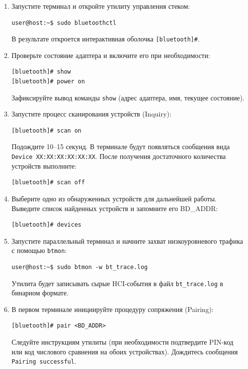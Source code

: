 \begin{enumerate}[nosep, leftmargin=*]
    \item Запустите терминал и откройте утилиту управления стеком:
    \begin{lstlisting}
user@host:~$ sudo bluetoothctl
    \end{lstlisting}
    В результате откроется интерактивная оболочка \texttt{[bluetooth]\#}.

    \item Проверьте состояние адаптера и включите его при необходимости:
    \begin{lstlisting}
[bluetooth]# show
[bluetooth]# power on
    \end{lstlisting}
    Зафиксируйте вывод команды \texttt{show} (адрес адаптера, имя, текущее состояние).

    \item Запустите процесс сканирования устройств (Inquiry):
    \begin{lstlisting}
[bluetooth]# scan on
    \end{lstlisting}
    Подождите 10--15 секунд. В терминале будут появляться сообщения вида \lstinline|Device XX:XX:XX:XX:XX:XX|. После получения достаточного количества устройств выполните:
    \begin{lstlisting}
[bluetooth]# scan off
    \end{lstlisting}

    \item Выберите одно из обнаруженных устройств для дальнейшей работы. Выведите список найденных устройств и запомните его BD\_ADDR:
    \begin{lstlisting}
[bluetooth]# devices
    \end{lstlisting}

    \item Запустите параллельный терминал и начните захват низкоуровневого трафика с помощью \texttt{btmon}:
    \begin{lstlisting}
user@host:~$ sudo btmon -w bt_trace.log
    \end{lstlisting}
    Утилита будет записывать сырые HCI-события в файл \texttt{bt\_trace.log} в бинарном формате.

    \item В первом терминале инициируйте процедуру сопряжения (Pairing):
    \begin{lstlisting}
[bluetooth]# pair <BD_ADDR>
    \end{lstlisting}
    Следуйте инструкциям утилиты (при необходимости подтвердите PIN-код или код числового сравнения на обоих устройствах). Дождитесь сообщения \texttt{Pairing successful}.


\end{enumerate}
